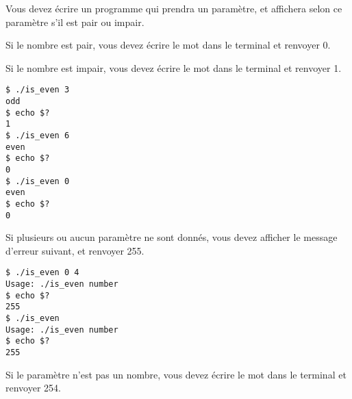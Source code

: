 

%
%

\vspace{0.7cm}

\noindent {}

\bigskip

\noindent Vous devez écrire un programme qui prendra un paramètre, et affichera selon ce paramètre s'il est pair ou impair.

\noindent Si le nombre est pair, vous devez écrire le mot  dans le terminal et renvoyer 0.

\noindent Si le nombre est impair, vous devez écrire le mot  dans le terminal et renvoyer 1.

\bigskip

\lstset{language=sh}
\begin{lstlisting}[frame=single,title={Cas général}]
$ ./is_even 3
odd
$ echo $?
1
$ ./is_even 6
even
$ echo $?
0
$ ./is_even 0
even
$ echo $?
0
\end{lstlisting}

\bigskip

\noindent Si plusieurs ou aucun paramètre ne sont donnés, vous devez afficher le message d'erreur suivant, et renvoyer 255.

\bigskip

\noindent {}

\bigskip

\lstset{language=sh}
\begin{lstlisting}[frame=single,title={Cas d'erreur 1}]
$ ./is_even 0 4
Usage: ./is_even number
$ echo $?
255
$ ./is_even
Usage: ./is_even number
$ echo $?
255
\end{lstlisting}

\bigskip

\noindent Si le paramètre n'est pas un nombre, vous devez écrire le mot  dans le terminal et renvoyer 254.

